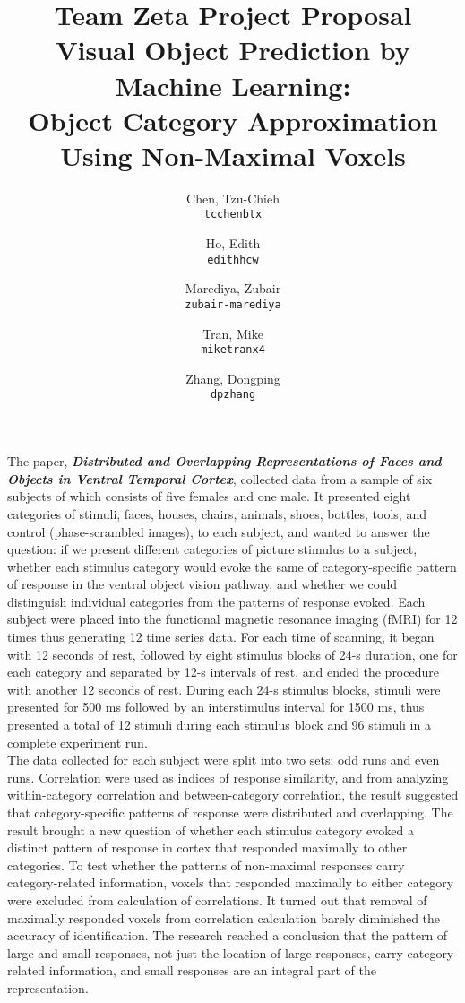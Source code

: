 \documentclass[11pt]{article}
\title{\textbf{Team Zeta Project Proposal}\\
Visual Object Prediction by Machine Learning: \\ 
Object Category Approximation Using Non-Maximal Voxels}
\author{
  Chen, Tzu-Chieh\\
  \texttt{tcchenbtx}
  \and
  Ho, Edith\\
  \texttt{edithhcw}
  \and
  Marediya, Zubair\\
  \texttt{zubair-marediya}
  \and
  Tran, Mike\\
  \texttt{miketranx4}
  \and
  Zhang, Dongping\\
  \texttt{dpzhang}
}
\begin{document}
\maketitle

The paper, \textbf{\emph{Distributed and Overlapping Representations of Faces
and Objects in Ventral Temporal Cortex}}\cite{object_rec_main}, collected data 
from a sample of six subjects of which consists of five females and one male. 
It presented eight categories of stimuli, faces, houses, chairs, animals, 
shoes, bottles, tools, and control (phase-scrambled images), to each subject, 
and wanted to answer the question: if we present different categories of 
picture stimulus to a subject, whether each stimulus category would evoke the 
same of category-specific pattern of response in the ventral object vision 
pathway, and whether we could distinguish individual categories from the 
patterns of response evoked. Each subject were placed into the functional 
magnetic resonance imaging (fMRI) for 12 times thus generating 12 time series 
data. For each time of scanning, it began with 12 seconds of rest, followed by 
eight stimulus blocks of 24-s duration, one for each category and separated by 
12-s intervals of rest, and ended the procedure with another 12 seconds of 
rest. During each 24-s stimulus blocks, stimuli were presented for 500 ms 
followed by an interstimulus interval for 1500 ms, thus presented a total of 12 
stimuli during each stimulus block and 96 stimuli in a complete experiment run.\\

The data collected for each subject were split into two sets: odd runs and even 
runs. Correlation were used as indices of response similarity, and from 
analyzing within-category correlation and between-category correlation, the 
result suggested that category-specific patterns of response were distributed 
and overlapping. The result brought a new question of whether each stimulus 
category evoked a distinct pattern of response in cortex that responded 
maximally to other categories. To test whether the patterns of non-maximal 
responses carry category-related information, voxels that responded maximally 
to either category were excluded from calculation of correlations. It turned 
out that removal of maximally responded voxels from correlation calculation 
barely diminished the accuracy of identification. The research reached a 
conclusion that the pattern of large and small responses, not just the location 
of large responses, carry category-related information, and small responses 
are an integral part of the representation.\\
\end{document}
